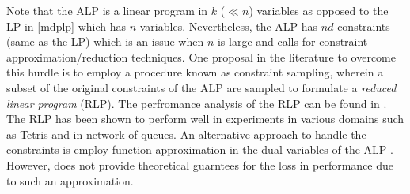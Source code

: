 Note that the ALP is a linear program in $k$ ($\ll n$) variables as opposed to the LP in \eqref{mdplp} which has $n$ variables. Nevertheless, the ALP has $nd$ constraints (same as the LP) which is an issue when $n$ is large and calls for constraint approximation/reduction techniques.
One proposal in the literature to overcome this hurdle is to employ a procedure known as constraint sampling, wherein a subset of the original constraints of the ALP are sampled to formulate a \emph{reduced linear program} (RLP). The perfromance analysis of the RLP can be found in \cite{CS}. The RLP has been shown to perform well in experiments \cite{ALP,CS,CST} 
in various domains such as Tetris and in network of queues. 
An alternative approach to handle the constraints is employ function approximation in the dual variables of the ALP \cite{ALP-Bor}. However, \cite{ALP-Bor} does not provide theoretical guarntees for the loss in performance due to such an approximation.\par 
